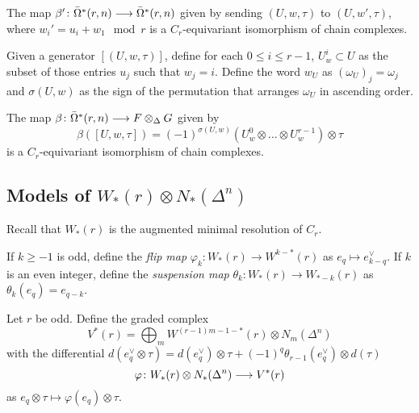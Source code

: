 
\begin{lemma}
	The map $\beta'\colon \bar{\Omega}^*(r,n)\longrightarrow \bar{\Omega}^*(r,n)$ given by sending $(U,w,\tau)$ to $(U,w',\tau)$, where $w_i' = u_i+w_1\mod r$ is a $C_r$-equivariant isomorphism of chain complexes.
\end{lemma}

Given a generator $[(U,w,\tau)]$, define for each $0\leq i\leq r-1$, $U_w^i \subset U$ as the subset of those entries $u_j$ such that $w_j=i$. Define the word $w_U$ as $(\omega_U)_j = \omega_j$ and $\sigma(U,w)$ as the sign of the permutation that arranges $\omega_U$ in ascending order. 

\begin{lemma}
	The map $\beta\colon \bar{\Omega}^*(r,n)\longrightarrow F\otimes_\Delta G$ given by
	\[\beta([U,w,\tau]) = (-1)^{\sigma(U,w)}(U_w^0\otimes\ldots\otimes U_w^{r-1})\otimes \tau\]
	is a $C_r$-equivariant isomorphism of chain complexes.
\end{lemma}

\subsection{Models of $W_*(r)\otimes N_*(\Delta^n)$}

Recall that $W_*(r)$ is the augmented minimal resolution of $C_r$.

\begin{definition}
	If $k\geq -1$ is odd, define the \emph{flip map} $\varphi_k\colon W_*(r)\to W^{k-*}(r)$ as $e_q\mapsto e^{\vee}_{k-q}$. If $k$ is an even integer, define the \emph{suspension map} $\theta_k\colon W_*(r)\to W_{*-k}(r)$ as $\theta_k(e_q) = e_{q-k}$.
\end{definition}

Let $r$ be odd. Define the graded complex
\[V^{*}(r) = \bigoplus_{m}W^{(r-1)m-1-*}(r)\otimes N_m(\Delta^n)\]
with the differential $d(e^\vee_q\otimes \tau) = d(e^\vee_q)\otimes \tau + (-1)^q \theta_{r-1}(e^\vee_q)\otimes d(\tau)$%
\[\varphi\colon W_*(r)\otimes N_*(\Delta^n)\longrightarrow V^{*}(r)\]
as $e_{q}\otimes \tau\mapsto \varphi(e_q)\otimes \tau$.


